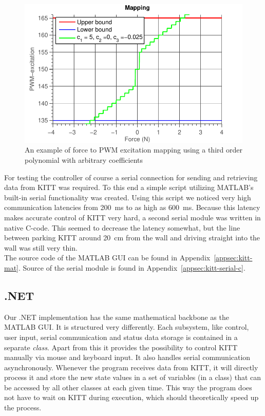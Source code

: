 \documentclass[11pt,titlepage]{report}
\begin{document}
\begin{figure}[H]
	\centering
	\includegraphics[width=0.7\linewidth]{resource/mapping.pdf}
	\caption{An example of force to PWM excitation mapping using a third order polynomial with arbitrary coefficients}
	\label{fig:int-mapping}
\end{figure}

For testing the controller of course a serial connection for sending and retrieving data from KITT was required. To this end a simple script utilizing MATLAB's built-in serial functionality was created. Using this script we noticed very high communication latencies from \SI{200}{ms} to as high as \SI{600}{ms}. Because this latency makes accurate control of KITT very hard, a second serial module was written in native C-code. This seemed to decrease the latency somewhat, but the line between parking KITT around \SI{20}{cm} from the wall and driving straight into the wall was still very thin.
\\
The source code of the MATLAB GUI can be found in Appendix~\ref{appsec:kitt-mat}. Source of the serial module is found in Appendix~\ref{appsec:kitt-serial-c}.

\subsection{.NET}
Our .NET implementation has the same mathematical backbone as the MATLAB GUI. It is structured very differently. Each subsystem, like control, user input, serial communication and status data storage is contained in a separate \textit{class}. Apart from this it provides the possibility to control KITT manually via mouse and keyboard input. It also handles serial communication asynchronously. Whenever the program receives data from KITT, it will directly process it and store the new state values in a set of variables (in a class) that can be accessed by all other classes at each given time. This way the program does not have to wait on KITT during execution, which should theoretically speed up the process.
\end{document}
